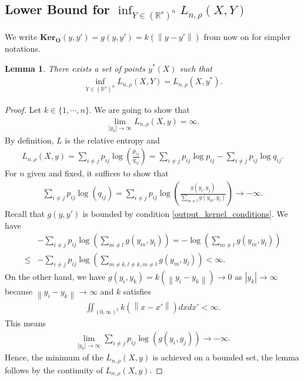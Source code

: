\documentclass[10pt]{article}
\newcommand{\norm}[1]{\left\lVert#1\right\rVert}
\newtheorem{lemma}{\bf Lemma}
\newenvironment{Proof of lemma}{\noindent{\bf Proof of Lemma}}{\hfill$\Box$\newline}
\newenvironment{Proof of claim}{\noindent{\bf Proof of claim}}{\hfill$\Box$\newline}
\newenvironment{Proof of theorem}{\noindent{\bf Proof of Theorem}}{\hfill\scriptsize{$\Box$}\newline}
\newenvironment{Proof of theorems}{\noindent{\bf Proof of Theorems}}{\hfill$\Box$\newline}
\newenvironment{Proof of proposition}{\noindent{\bf Proof of Proposition}}{\hfill$\Box$\newline}
\newenvironment{Proof of propositions}{\noindent{\bf Proof of Propositions}}{\hfill$\Box$\newline}
\newenvironment{Proof of exercise}{\noindent{\it Proof of Exercise:}}{\hfill$\Box$}
\numberwithin{equation}{section}
\newcommand{\ko}{\mathbf{Ker}_{\mathbf{O}}}
\begin{document}
\subsection{Lower Bound for \texorpdfstring{$\inf_{Y \in (\mathbb{R}^s)^n}L_{n,\rho}(X,Y)$}{L(X,Y)}} \label{tsne:sec:lower_bound}
We write $\ko(y,y') = g(y,y') = k(\norm{y-y'})$ from now on for simpler notations.
\begin{lemma} \label{lower_bound_lemma_1}
    There exists a set of points $y^*(X)$ such that
    \begin{align}
        \inf_{Y \in (\mathbb{R}^s)^n}L_{n,\rho}(X,Y) = L_{n,\rho}(X,y^*).
    \end{align}
\end{lemma}
\begin{proof}
    Let $k \in \{1,\cdots, n\}$. We are going to show that
    \begin{align}
        \lim_{|y_k| \to \infty} L_{n,\rho}(X,y) = \infty.
    \end{align}
    By definition, $L$ is the relative entropy and
    \begin{align}
        L_{n,\rho}(X,y) = \sum_{i \neq j} p_{ij}\log \left(\frac{p_{ij}}{q_{ij}}\right) = \sum_{i \neq j} p_{ij}\log p_{ij} - \sum_{i \neq j} p_{ij}\log q_{ij}.
    \end{align}
    For $n$ given and fixed, it suffices to show that
    \begin{align}
        \sum_{i \neq j} p_{ij}\log (q_{ij}) = \sum_{i \neq j} p_{ij}\log \left(\frac{g(y_i,y_j)}{\sum_{m \neq l}g(y_m,y_l)}\right) \to -\infty.
    \end{align}
    Recall that $g(y,y')$ is bounded by condition \ref{output_kernel_conditions}. We have
    \begin{align}
             & -\sum_{i \neq j} p_{ij} \log \left(\sum_{m \neq l}g(y_m,y_l) \right) = -\log \left(\sum_{m \neq l}g(y_m,y_l) \right) \nonumber \\
        \leq & -\sum_{i \neq j} p_{ij} \log \left(\sum_{m\neq k, l \neq k, m \neq l}g(y_m,y_l) \right) < \infty.
    \end{align}
    On the other hand, we have $g(y_i,y_k) = k (\norm{y_i-y_k}) \to 0$ as $|y_k| \to \infty$ because $\norm{y_i-y_k} \to \infty$ and $k$ satisfies
    \begin{align}
        \iint_{(0,\infty)^2} k(\norm{x-x'}) dxdx' < \infty.
    \end{align}
    This means
    \begin{align}
        \lim_{|y_k| \to \infty}\sum_{i \neq j} p_{ij} \log (g(y_i,y_j)) \to -\infty.
    \end{align}
    Hence, the minimum of the $L_{n,\rho}(X,y)$ is achieved on a bounded set, the lemma follows by the continuity of $L_{n,\rho}(X,y)$.
\end{proof}
\end{document}
